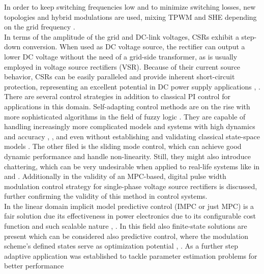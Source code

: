 In order to keep switching frequencies low and to minimize switching losses, new topologies and hybrid modulations are used, mixing TPWM and SHE depending on the grid frequency \cite{venkatraman2018multilevel}.\\

    In terms of the amplitude of the grid and DC-link voltages, CSRs exhibit a step-down conversion. When used as DC voltage source, the rectifier can output a lower DC voltage without the need of a grid-side transformer, as is usually employed in voltage source rectifiers (VSR). Because of their current source behavior, CSRs can be easily paralleled and provide inherent short-circuit protection, representing an excellent potential in DC power supply applications \cite{feroura2017finite}, \cite{yan2015study}.\\
		
    There are several control strategies in addition to classical PI control for applications in this domain. Self-adapting control methods are on the rise with more sophisticated algorithms in the field of fuzzy logic \cite{urmos2017application}. They are capable of handling increasingly more complicated models and systems with high dynamics and accuracy \cite{chatterjee2008augmented}, \cite{haidegger2012simulation}, and even without establishing and validating classical state-space models \cite{vrkalovic2018model}. The other filed is the sliding mode control, which can achieve good dynamic performance and handle non-linearity. Still, they might also introduce chattering, which can be very undesirable when applied to real-life systems like in \cite{regaya2014new} and \cite{szell2014mathematical}. Additionally in \cite{ahmed2014model} the validity of an MPC-based, digital pulse width modulation control strategy for single-phase voltage source rectifiers is discussed, further confirming the validity of this method in control systems.\\
		
    In the linear domain implicit model predictive control (IMPC or just MPC) is a fair solution due its effectiveness in power electronics due to its configurable cost function and such scalable nature \cite{kelemen2010constrained}, \cite{ahmed2014model}. In this field also finite-state solutions are present which can be considered also predictive control, where the modulation scheme’s defined states serve as optimization potential \cite{rivera2013predictive}, \cite{godlewska2015predictive}. As a further step adaptive application was established to tackle parameter estimation problems for better performance \cite{muthukumar2016adaptive}\\
		
